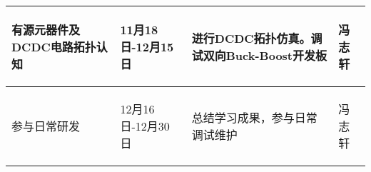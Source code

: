 \begin{longtable}{ p{1.5cm} | p{3cm} | p{6cm} | p{4.3cm} |}
    \hline

        \begin{center}
            有源元器件及DCDC电路拓扑认知
        \end{center}&
        \begin{center}
            11月18日-12月15日
        \end{center}&
        \begin{center}
           进行DCDC拓扑仿真。调试双向Buck-Boost开发板
        \end{center}&
        \begin{center}
            冯志轩
        \end{center}\\
        
    \hline
    
        \begin{center}
            参与日常研发
        \end{center} &
        \begin{center}
            12月16日-12月30日
        \end{center} &
        \begin{center}
            总结学习成果，参与日常调试维护
        \end{center} &
        \begin{center}
            冯志轩
        \end{center} \\

    \hline
    
\end{longtable}
